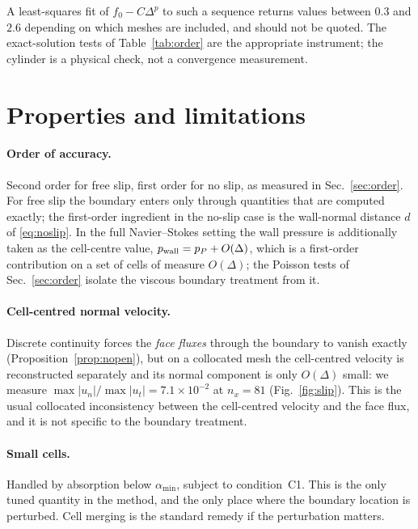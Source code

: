 \documentclass[11pt,a4paper]{article}
\theoremstyle{remark}
\begin{document}
A least-squares fit of $f_0-C\Delta^p$ to such a sequence returns values between $0.3$ and
$2.6$ depending on which meshes are included, and should not be quoted. The exact-solution
tests of Table~\ref{tab:order} are the appropriate instrument; the cylinder is a physical
check, not a convergence measurement.

\section{Properties and limitations}\label{sec:limits}

\paragraph{Order of accuracy.} Second order for free slip, first order for no slip, as
measured in Sec.~\ref{sec:order}. For free slip the boundary enters only through quantities
that are computed exactly; the first-order ingredient in the no-slip case is the wall-normal
distance $d$ of \eqref{eq:noslip}. In the full Navier--Stokes setting the wall pressure is
additionally taken as the cell-centre value, $p_{\rm wall}=p_P+O(\Delta)$, which is a
first-order contribution on a set of cells of measure $O(\Delta)$; the Poisson tests of
Sec.~\ref{sec:order} isolate the viscous boundary treatment from it.

\paragraph{Cell-centred normal velocity.} Discrete continuity forces the \emph{face fluxes}
through the boundary to vanish exactly (Proposition~\ref{prop:nopen}), but on a collocated
mesh the cell-centred velocity is reconstructed separately and its normal component is only
$O(\Delta)$ small: we measure $\max|u_n|/\max|u_t|=7.1\times10^{-2}$ at $n_x=81$
(Fig.~\ref{fig:slip}). This is the usual collocated inconsistency between the cell-centred
velocity and the face flux, and it is not specific to the boundary treatment.

\paragraph{Small cells.} Handled by absorption below $\alpha_{\min}$, subject to condition~C1.
This is the only tuned quantity in the method, and the only place where the boundary location
is perturbed. Cell merging is the standard remedy if the perturbation matters.
\end{document}
